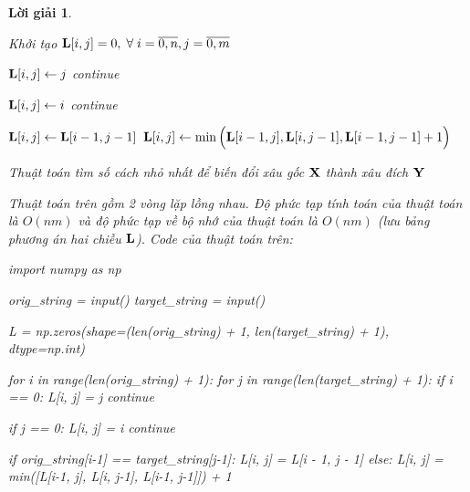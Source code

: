 \documentclass[14pt, a4paper]{article}
\theoremstyle{sltheorem}
\theoremstyle{soltheorem}
\newtheorem*{loigiai}{Lời giải}
\begin{document}
\begin{loigiai}
\begin{itemize} [label={$-$}]
        \begin{algorithm}[h!]
            \DontPrintSemicolon
            Khởi tạo $\bold{L} \lbrack i, j \rbrack =0, \thickspace \forall \thickspace i=\overline{0, n}, j=\overline{0,m}$\;
             {
                 {
                    {

                        $\bold{L} \lbrack i, j \rbrack \gets j$\;
                        continue\;
                    }
                    {

                        $\bold{L} \lbrack i, j \rbrack \gets i$\;
                        continue\;
                    }
                    {
                        $\bold{L} \lbrack i, j \rbrack \gets \bold{L} \lbrack i-1, j-1 \rbrack$\;
                    }
                    \Else 
                    {
                        $\bold{L} \lbrack i, j \rbrack \gets \min \Big ( \bold{L} \lbrack i-1, j \rbrack, \bold{L} \lbrack i, j-1 \rbrack, \bold{L} \lbrack i-1, j-1 \rbrack + 1 \Big)$\;
                    }
                }
            }
            \;
            \caption{Thuật toán tìm số cách nhỏ nhất để biến đổi xâu gốc $\bold{X}$ thành xâu đích $\bold{Y}$}
        \end{algorithm}

        Thuật toán trên gồm 2 vòng lặp lồng nhau. Độ phức tạp tính toán của thuật toán là $O(nm)$ và độ phức tạp về bộ nhớ của thuật toán là $O(nm)$ (lưu bảng phương án hai chiều $\bold{L}$). 
        Code của thuật toán trên:
        \begin{python}
import numpy as np

orig_string = input()
target_string = input()

L = np.zeros(shape=(len(orig_string) + 1, len(target_string) + 1), dtype=np.int)


for i in range(len(orig_string) + 1):
    for j in range(len(target_string) + 1):
        if i == 0:
            L[i, j] = j
            continue

        if j == 0:
            L[i, j] = i
            continue

        if orig_string[i-1] == target_string[j-1]:
            L[i, j] = L[i - 1, j - 1]
        else:
            L[i, j] = min([L[i-1, j], L[i, j-1], L[i-1, j-1]]) + 1



\end{python}
\end{itemize}
\end{loigiai}
\end{document}
